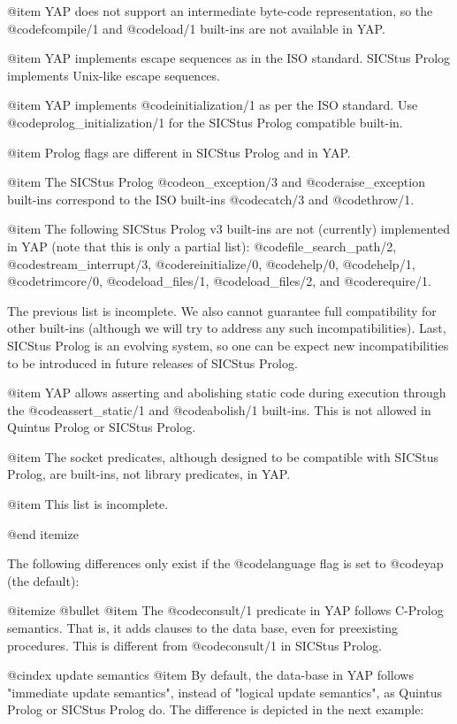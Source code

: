 {{{{{{{{{@item YAP does not support an intermediate byte-code
representation, so the @code{fcompile/1} and @code{load/1} built-ins are
not available in YAP.

@item YAP implements escape sequences as in the ISO standard. SICStus
Prolog implements Unix-like escape sequences.

@item YAP implements @code{initialization/1} as per the ISO
standard. Use @code{prolog_initialization/1} for the SICStus Prolog
compatible built-in.

@item Prolog flags are different in SICStus Prolog and in YAP.

@item The SICStus Prolog @code{on_exception/3} and
@code{raise_exception} built-ins correspond to the ISO built-ins
@code{catch/3} and @code{throw/1}.

@item The following SICStus Prolog v3 built-ins are not (currently)
implemented in YAP (note that this is only a partial list):
@code{file_search_path/2},
@code{stream_interrupt/3}, @code{reinitialize/0}, @code{help/0},
@code{help/1}, @code{trimcore/0}, @code{load_files/1},
@code{load_files/2}, and @code{require/1}.

      The previous list is incomplete. We also cannot guarantee full
compatibility for other built-ins (although we will try to address any
such incompatibilities). Last, SICStus Prolog is an evolving system, so
one can be expect new incompatibilities to be introduced in future
releases of SICStus Prolog.

@item YAP allows asserting and abolishing static code during
execution through the @code{assert_static/1} and @code{abolish/1}
built-ins. This is not allowed in Quintus Prolog or SICStus Prolog.

@item The socket predicates, although designed to be compatible with
SICStus Prolog, are built-ins, not library predicates, in YAP.

@item This list is incomplete.

@end itemize

The following differences only exist if the @code{language} flag is set
to @code{yap} (the default):

@itemize @bullet
@item The @code{consult/1} predicate in YAP follows C-Prolog
semantics. That is, it adds clauses to the data base, even for
preexisting procedures. This is different from @code{consult/1} in
SICStus Prolog.

@cindex update semantics
@item By default, the data-base in YAP follows "immediate update
semantics", instead of "logical update semantics", as Quintus Prolog or
SICStus Prolog do. The difference is depicted in the next example:

}}}}}}}}}
